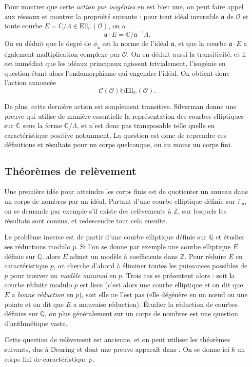 \documentclass[11pt,a4paper]{article}
\newcommand{\Z}{\mathbb{Z}}
\newcommand{\C}{\mathbb{C}}
\newcommand{\F}{\mathbb{F}}
\newcommand{\Q}{\mathbb{Q}}
\renewcommand{\O}{\mathcal{O}}
\newcommand{\Cl}{\mathcal{C}}
\newcommand{\Ell}{\mathrm{Ell}}
\renewcommand{\frak}{\mathfrak}
\theoremstyle{definition}
\begin{document}
Pour montrer que cette \emph{action par isogénies} en est bien une, on peut faire appel aux réseaux et montrer la propriété suivante : pour tout idéal inversible $\frak a$ de $\O$ et toute courbe $E=\C/\Lambda\in \Ell_\C(\O)$, on a
$$\frak a\cdot E = \C/\frak a^{-1} \Lambda.$$
On en déduit que le degré de $\phi_{\frak a}$ est la norme de l'idéal $\frak a$, et que la courbe $\frak a\cdot E$ a également multiplication complexe par $\O$. On en déduit aussi la transitivité, et il est immédiat que les idéaux principaux agissent trivialement, l'isogénie en question étant alors l'endomorphisme qui engendre l'idéal. On obtient donc l'action annoncée
$$\Cl(\O) \circlearrowright \Ell_\C(\O).$$

De plus, cette dernière action est simplement transitive. Silverman donne une preuve qui utilise de manière essentielle la représentation des courbes elliptiques sur $\C$ sous la forme $\C/\Lambda$, et n'est donc pas transposable telle quelle en caractéristique positive notamment. La question est donc de reprendre ces définitions et résultats pour un corps quelconque, ou au moins un corps fini.

\subsection{Théorèmes de relèvement}

Une première idée pour atteindre les corps finis est de quotienter un anneau dans un corps de nombres par un idéal. Partant d'une courbe elliptique définie sur $\F_p$, on se demande par exemple s'il existe des relèvements à $\Z$, sur lesquels les résultats sont connus, et redescendre tout cela ensuite. 

Le problème inverse est de partir d'une courbe elliptique définie sur $\Q$ et étudier ses réductions modulo $p$. Si l'on se donne par exemple une courbe elliptique $E$ définie sur $\Q$, alors $E$ admet un modèle à coefficients dans $\Z$. Pour réduire $E$ en caractéristique $p$, on cherche d'abord à éliminer toutes les puissances possibles de $p$ pour trouver un \emph{modèle minimal} en $p$. Trois cas se présentent alors : soit la courbe réduite modulo $p$ est lisse (c'est alors une courbe elliptique et on dit que $E$ a \emph{bonne réduction} en $p$), soit elle ne l'est pas (elle dégénère en un n\oe ud ou une pointe et on dit que $E$ a mauvaise réduction). Étudier la réduction de courbes définies sur $\Q$, ou plus généralement sur un corps de nombres est une question d'arithmétique vaste.

Cette question de relèvement est ancienne, et on peut utiliser les théorèmes suivants, dus à Deuring et dont une preuve apparaît dans \cite{Lang}. On se donne ici $k$ un corps fini de caractéristique $p$.
\end{document}
